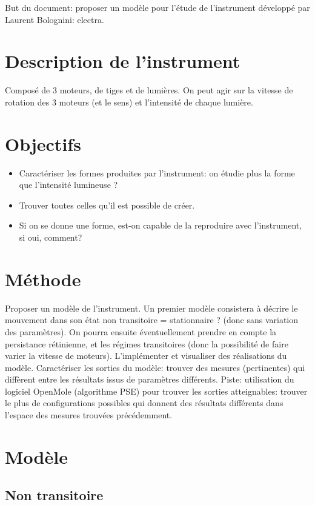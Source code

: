 \documentclass[11pt,a4paper]{article}
\begin{document}
But du document: proposer un modèle pour l'étude de l'instrument développé par Laurent Bolognini: electra.

\section{Description de l'instrument}
Composé de 3 moteurs, de tiges et de lumières.
On peut agir sur la vitesse de rotation des 3 moteurs (et le sens) et l'intensité de chaque lumière.


\section{Objectifs}
\begin{itemize}
\item Caractériser les formes produites par l'instrument: on étudie plus la forme que l'intensité lumineuse ?
\item Trouver toutes celles qu'il est possible de créer.
\item Si on se donne une forme, est-on capable de la reproduire avec l'instrument, si oui, comment?
\end{itemize}

\section{Méthode}
Proposer un modèle de l'instrument. Un premier modèle consistera à décrire le mouvement dans son état non transitoire = stationnaire ? (donc sans variation des paramètres).
On pourra ensuite éventuellement prendre en compte la persistance rétinienne, et les régimes transitoires (donc la possibilité de faire varier la vitesse de moteurs).
L'implémenter et visualiser des réalisations du modèle.
Caractériser les sorties du modèle: trouver des mesures (pertinentes) qui diffèrent entre les résultats issus de paramètres différents.
Piste: utilisation du logiciel OpenMole (algorithme PSE) pour trouver les sorties atteignables: trouver le plus de configurations possibles qui donnent des résultats différents dans l'espace des mesures trouvées précédemment.


\section{Modèle}

\subsection{Non transitoire}
\end{document}
